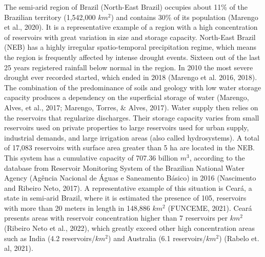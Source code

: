 \documentclass[draft]{agujournal2019}
\begin{document}
The semi-arid region of Brazil (North-East Brazil) occupies about 11\% of the Brazilian territory (1,542,000 $km^2$) and contains 30\% of its population (Marengo et al., 2020). It is a representative example of a region with a high concentration of reservoirs with great variation in size and storage capacity. North-East Brazil (NEB) has a highly irregular spatio-temporal precipitation regime, which means the region is frequently affected by intense drought events. Sixteen out of the last 25 years registered rainfall below normal in the region. In 2010 the most severe drought ever recorded started, which ended in 2018 (Marengo et al. 2016, 2018). The combination of the predominance of soils and geology with low water storage capacity produces a dependency on the superficial storage of water (Marengo, Alves, et al., 2017; Marengo, Torres, \& Alves, 2017). Water supply then relies on the reservoirs that regularize discharges. Their storage capacity varies from small reservoirs used on private properties to large reservoirs used for urban supply, industrial demands, and large irrigation areas (also called hydrosystems). A total of 17,083 reservoirs with surface area greater than 5 ha are located in the NEB. This system has a cumulative capacity of 707.36 billion $m^3$, according to the database from Reservoir Monitoring System of the Brazilian National Water Agency (Agência Nacional de Águas e Saneamento Básico) in 2016 (Nascimento and Ribeiro Neto, 2017). A representative example of this situation is Ceará, a state in semi-arid Brazil, where it is estimated the presence of 105, reservoirs with more than 20 meters in length in 148,886 $km^2$ (FUNCEME, 2021). Ceará presents areas with reservoir concentration higher than 7 reservoirs per $km^2$ (Ribeiro Neto et al., 2022), which greatly exceed other high concentration areas such as India (4.2 reservoirs/$km^2$) and Australia (6.1 reservoirs/$km^2$) (Rabelo et. al, 2021).\\
\end{document}
